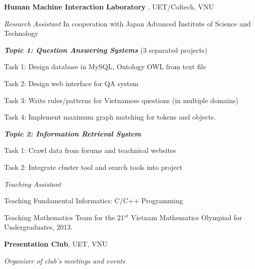 \documentclass[9pt]{extreport}
\renewcommand{\section}[2]%
        {\pagebreak[2]\vspace{0.8\baselineskip}%
         \hspace{0in}%
         \marginpar{
         \raggedright \emph{#1}}#2}
\newenvironment{innerlist}[1][\enskip\textbullet]%
        {\vspace{0.2\baselineskip}\begin{compactitem}[#1]}{\end{compactitem}}
\begin{document}
\section{2010-2013}
\textbf{Human Machine Interaction Laboratory }, UET/Coltech, VNU
\begin{innerlist}
\item[] \textit{Research Assistant} \hfill In cooperation with Japan Advanced Institute of Science and Technology
    \begin{innerlist}
    \item \textbf{\textit{Topic 1: Question Answering Systems}} (3 separated projects)
    \item Task 1: Design database in MySQL, Ontology OWL from text file
    \item Task 2: Design web interface for QA system
    \item Task 3: Write rules/patterns for Vietnamese questions (in multiple domains)
	\item Task 4: Implement maximum graph matching for tokens and objects.
    \item \textbf{\textit{Topic 2: Information Retrieval System}}
    \item Task 1: Crawl data from forums and teachnical websites
    \item Task 2: Integrate cluster tool and search tools into project
    \end{innerlist}
\end{innerlist}
\vspace{.4\baselineskip}
\begin{innerlist}
\item[] \textit{Teaching Assistant} %
 	\begin{innerlist}
     \item Teaching Fundamental Informatics: C/C++ Programming
     \item Teaching Mathematics Team for the 21$^{st}$ Vietnam Mathematics Olympiad for Undergraduates, 2013.
    \end{innerlist}
\end{innerlist}


\section{2011}
\textbf{Presentation Club}, UET, VNU
\begin{innerlist}
\item[] \textit{Organizer of club's meetings and events} %
\end{innerlist}
\end{document}
